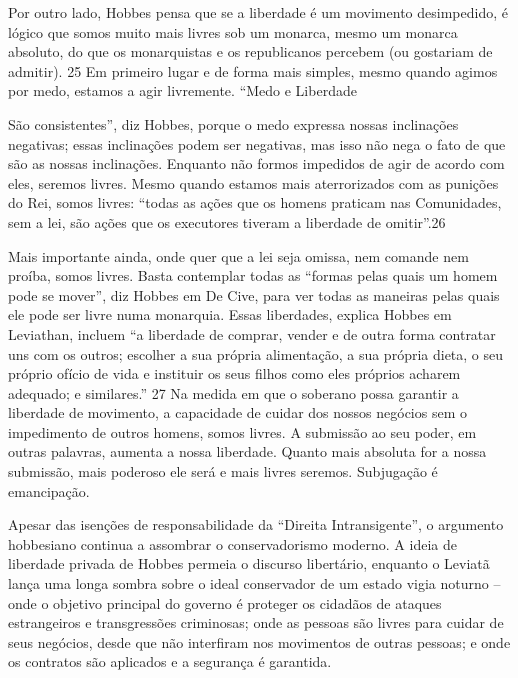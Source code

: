 \par 
Por outro lado, Hobbes pensa que se a liberdade é um movimento desimpedido, é lógico que somos muito mais livres sob um monarca, mesmo um monarca absoluto, do que os monarquistas e os republicanos percebem (ou gostariam de admitir). {\color{blue}25} Em primeiro lugar e de forma mais simples, mesmo quando agimos por medo, estamos a agir livremente. “Medo e Liberdade
 \par 
São consistentes”, diz Hobbes, porque o medo expressa nossas inclinações negativas; essas inclinações podem ser negativas, mas isso não nega o fato de que são as nossas inclinações. Enquanto não formos impedidos de agir de acordo com eles, seremos livres. Mesmo quando estamos mais aterrorizados com as punições do Rei, somos livres: “todas as ações que os homens praticam nas Comunidades, sem a lei, são ações que os executores tiveram a liberdade de omitir”.{\color{blue}26}
 \par 
Mais importante ainda, onde quer que a lei seja omissa, nem comande nem proíba, somos livres. Basta contemplar todas as “formas pelas quais um homem pode se mover”, diz Hobbes em De Cive, para ver todas as maneiras pelas quais ele pode ser livre numa monarquia. Essas liberdades, explica Hobbes em Leviathan, incluem “a liberdade de comprar, vender e de outra forma contratar uns com os outros; escolher a sua própria alimentação, a sua própria dieta, o seu próprio ofício de vida e instituir os seus filhos como eles próprios acharem adequado; e similares.” {\color{blue}27} Na medida em que o soberano possa garantir a liberdade de movimento, a capacidade de cuidar dos nossos negócios sem o impedimento de outros homens, somos livres. A submissão ao seu poder, em outras palavras, aumenta a nossa liberdade. Quanto mais absoluta for a nossa submissão, mais poderoso ele será e mais livres seremos. Subjugação é emancipação.
 \par 
Apesar das isenções de responsabilidade da “Direita Intransigente”, o argumento hobbesiano continua a assombrar o conservadorismo moderno. A ideia de liberdade privada de Hobbes permeia o discurso libertário, enquanto o Leviatã lança uma longa sombra sobre o ideal conservador de um estado vigia noturno – onde o objetivo principal do governo é proteger os cidadãos de ataques estrangeiros e transgressões criminosas; onde as pessoas são livres para cuidar de seus negócios, desde que não interfiram nos movimentos de outras pessoas; e onde os contratos são aplicados e a segurança é garantida.
 \par 
